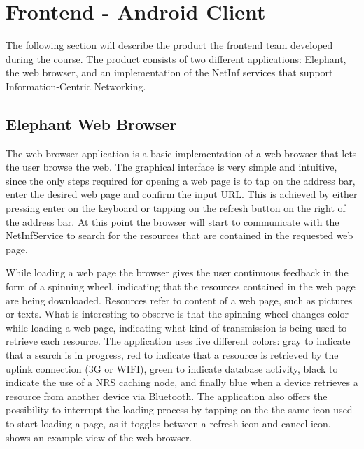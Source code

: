 \section {Frontend - Android Client}
The following section will describe the product the frontend team developed during the course.
The product consists of two different applications: Elephant, the web browser, and an implementation
of the NetInf services that support Information-Centric Networking.

\subsection{Elephant Web Browser}
\label{sec:Elephant Web Browser}
The web browser application is a basic implementation of a web browser that lets the user browse
the web. The graphical interface is very simple and intuitive, since the only steps required for
opening a web page is to tap on the address bar, enter the desired web page and confirm the input URL.
This is achieved by either pressing enter on the keyboard or tapping on the refresh button on the right
of the address bar. At this point the browser will start to communicate with the NetInfService to
search for the resources that are contained in the requested web page.

While loading a web page the browser gives the user continuous feedback in the form of a spinning wheel,
indicating that the resources contained in the web page are being downloaded.
Resources refer to content of a web page, such as pictures or texts.
What is interesting to observe is that the spinning wheel changes color while loading a web page,
indicating what kind of transmission is being used to retrieve each resource.
The application uses five different colors: gray to indicate that a search is in progress, red to indicate
that a resource is retrieved by the uplink connection (3G or WIFI), green to indicate database activity,
black to indicate the use of a NRS caching node, and finally blue when a device retrieves a resource from
another device via Bluetooth. The application also offers the possibility to interrupt the
loading process by tapping on the the same icon used to start loading a page, as it toggles between a refresh
icon and cancel icon.  shows an example view of the web browser.\\

